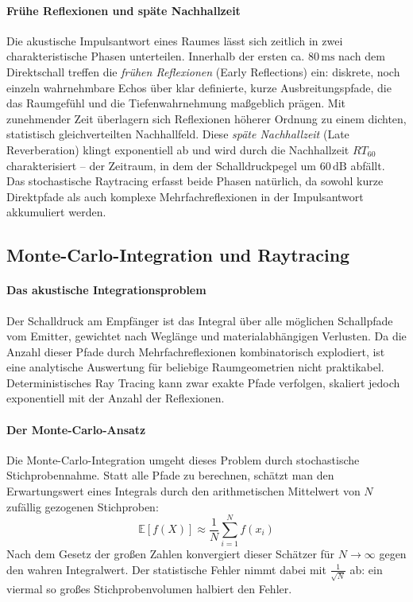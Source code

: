 \documentclass{article}
\begin{document}
    \paragraph{Frühe Reflexionen und späte Nachhallzeit}

    Die akustische Impulsantwort eines Raumes lässt sich zeitlich in zwei charakteristische
    Phasen unterteilen.
    Innerhalb der ersten ca. $80\,\text{ms}$ nach dem Direktschall treffen die
    \emph{frühen Reflexionen} (Early Reflections) ein: diskrete, noch einzeln wahrnehmbare
    Echos über klar definierte, kurze Ausbreitungspfade, die das Raumgefühl und die
    Tiefenwahrnehmung maßgeblich prägen.
    Mit zunehmender Zeit überlagern sich Reflexionen höherer Ordnung zu einem dichten,
    statistisch gleichverteilten Nachhallfeld. Diese \emph{späte Nachhallzeit}
    (Late Reverberation) klingt exponentiell ab und wird durch die Nachhallzeit $RT_{60}$
    charakterisiert -- der Zeitraum, in dem der Schalldruckpegel um $60\,\text{dB}$ abfällt.
    Das stochastische Raytracing erfasst beide Phasen natürlich, da sowohl kurze Direktpfade
    als auch komplexe Mehrfachreflexionen in der Impulsantwort akkumuliert werden.

    \subsection{Monte-Carlo-Integration und Raytracing}
    \label{subsec:montecarlo}

    \paragraph{Das akustische Integrationsproblem}

    Der Schalldruck am Empfänger ist das Integral über alle möglichen Schallpfade vom Emitter,
    gewichtet nach Weglänge und materialabhängigen Verlusten. Da die Anzahl dieser Pfade durch
    Mehrfachreflexionen kombinatorisch explodiert, ist eine analytische Auswertung für
    beliebige Raumgeometrien nicht praktikabel. Deterministisches Ray Tracing kann zwar exakte
    Pfade verfolgen, skaliert jedoch exponentiell mit der Anzahl der Reflexionen.

    \paragraph{Der Monte-Carlo-Ansatz}

    Die Monte-Carlo-Integration umgeht dieses Problem durch stochastische Stichprobennahme.
    Statt alle Pfade zu berechnen, schätzt man den Erwartungswert eines Integrals durch den
    arithmetischen Mittelwert von $N$ zufällig gezogenen Stichproben:
    \[\mathbb{E}[f(X)] \approx \frac{1}{N} \sum_{i=1}^{N} f(x_i)\]
    Nach dem Gesetz der großen Zahlen konvergiert dieser Schätzer für $N \to \infty$ gegen
    den wahren Integralwert. Der statistische Fehler nimmt dabei mit $\frac{1}{\sqrt{N}}$ ab:
    ein viermal so großes Stichprobenvolumen halbiert den Fehler.
\end{document}
